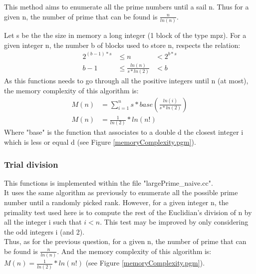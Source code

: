 \documentclass[12pt]{article} %
\begin{document}
This method aims to enumerate all the prime numbers until a sail n.   Thus for a given n, the number of prime that can be found is $\frac{n}{ln(n)}$.

Let s be the the size in memory a long integer (1 block of the type mpz).  For a given integer n, the number b of blocks used to store n, respects the relation:
\begin{equation}
\begin{aligned}
	2^{(b-1)*s}	& \leq n 						&<2^{b * s} \\
	b-1			& \leq \frac{ln(n)}{s * ln(2)}	&< b
\end{aligned}
\end{equation}
As this functions needs to go through all the positive integers until n (at most), the memory complexity of this algorithm is:\\
\begin{equation}
\begin{aligned}
	M(n) &= \sum_{i=1}^{n}{s*base(\frac{ln(i)}{s*ln(2)})}\\
    M(n) &= \frac{1}{ln(2)} * ln (n!)
\end{aligned}
\end{equation}
Where "base" is the function that associates to a double d the closest integer i which is less or equal d (see Figure \ref{memoryComplexity.pgm}).









\subsubsection{Trial division}
This functions is implemented within the file "largePrime\_naive.cc".\\  
It uses the same algorithm as previously to enumerate all the possible prime number until a randomly picked rank.   However, for a given integer n, the primality test used here is to compute the rest of the Euclidian's division of n by all the integer i such that $i < n$.   This test may be improved by only considering the odd integers i (and 2).\\

Thus, as for the previous question, for a given n, the number of prime that can be found is $\frac{n}{ln(n)}$.   And the memory complexity of this algorithm is: $M(n) = \frac{1}{ln(2)} * ln (n!)$ (see Figure \ref{memoryComplexity.pgm}).\\
\end{document}
